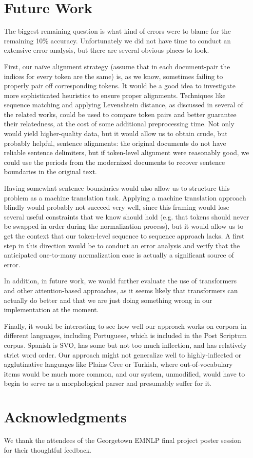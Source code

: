 \documentclass[11pt,a4paper]{article}
\begin{document}
\section{Future Work}
The biggest remaining question is what kind of errors were to blame for the remaining 10\% accuracy. Unfortunately we did not have time to conduct an extensive error analysis, but there are several obvious places to look. 

First, our na\"ive alignment strategy (assume that in each document-pair the indices for every token are the same) is, as we know, sometimes failing to properly pair off corresponding tokens. It would be a good idea to investigate more sophisticated heuristics to ensure proper alignments. Techniques like sequence matching and applying Levenshtein distance, as discussed in several of the related works, could be used to compare token pairs and better guarantee their relatedness, at the cost of some additional preprocessing time. Not only would yield higher-quality data, but it would allow us to obtain crude, but probably helpful, sentence alignments: the original documents do not have reliable sentence delimiters, but if token-level alignment were reasonably good, we could use the periods from the modernized documents to recover sentence boundaries in the original text. 

Having somewhat sentence boundaries would also allow us to structure this problem as a machine translation task. Applying a machine translation approach blindly would probably not succeed very well, since this framing would lose several useful constraints that we know should hold (e.g. that tokens should never be swapped in order during the normalization process), but it would allow us to get the context that our token-level sequence to sequence approach lacks. A first step in this direction would be to conduct an error analysis and verify that the anticipated one-to-many normalization case is actually a significant source of error.

In addition, in future work, we would further evaluate the use of transformers and other attention-based approaches, as it seems likely that transformers can actually do better and that we are just doing something wrong in our implementation at the moment.

Finally, it would be interesting to see how well our approach works on corpora in different languages, including Portuguese, which is included in the Post Scriptum corpus. Spanish is SVO, has some but not too much inflection, and has relatively strict word order. Our approach might not generalize well to highly-inflected or agglutinative languages like Plains Cree or Turkish, where out-of-vocabulary items would be much more common, and our system, unmodified, would have to begin to serve as a morphological parser and presumably suffer for it.

\section*{Acknowledgments}
We thank the attendees of the Georgetown EMNLP final project poster session for their thoughtful feedback.



\end{document}
